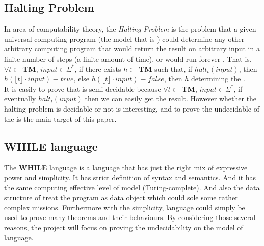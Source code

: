 \subsection{Halting Problem}
\label{definition of h}
In area of computability theory, the \textit{Halting Problem} is the problem that a given universal computing program (the model that is  \cite{jones_computability_1997}) 
could determine any other arbitrary computing program that would return the result on arbitrary input in a finite number of steps (a finite amount of time), or would run forever \cite{_halting_2015}.
That is, $\forall t \in$ \textbf{TM}, $input \in \Sigma^{*}$, if there exists $h \in$ \textbf{TM} such that, if $halt_{t}(input)$, then $h(\lfloor t\rfloor \cdot input) \equiv true$, else $h(\lfloor t\rfloor \cdot input) \equiv false$, then $h$ determining the .\\
It is easily to prove that  is semi-decidable\cite{_halting_2015} because $\forall t \in$ \textbf{TM}, $input \in \Sigma^{*}$, if eventually $halt_{t}(input)$ then we can easily get the result.
However whether the halting problem is decidable or not is interesting, and to prove the undecidable of the  is the main target of this paper.

\subsection{WHILE language}
The \textbf{WHILE} language is a language that has just the right mix of expressive power and simplicity. 
It has strict definition of syntax and semantics. And it has the same computing effective level of  model (Turing-complete)\cite{jones_computability_1997}. 
And also the data structure of \WHILE treat the program as data object which could sole some rather complex missions. 
Furthermore with the simplicity, \WHILE language could simply be used to prove many theorems and their behaviours. 
By considering those several reasons, the project will focus on proving the  undecidability on the model of \WHILE language\cite{jones_computability_1997}.

